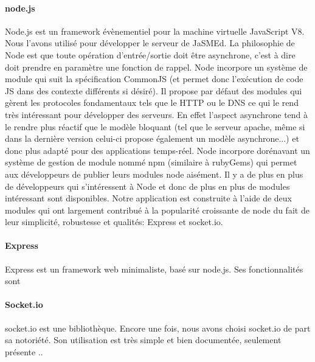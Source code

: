 \documentclass[pdftex,12pt,a4paper]{article}
\begin{document}
\paragraph{node.js}
Node.js est un framework évènementiel pour la machine virtuelle JavaScript V8. Nous l’avons utilisé pour développer le serveur de JaSMEd.
La philosophie de Node est que toute opération d’entrée/sortie doit être asynchrone, c’est à dire doit prendre en paramètre une fonction de rappel.
Node incorpore un système de module qui suit la spécification CommonJS (et permet donc l'exécution de code JS dans des contexte différents si désiré). Il propose par défaut des modules qui gèrent les protocoles fondamentaux tels que le HTTP ou le DNS ce qui le rend très intéressant pour développer des serveurs. En effet l’aspect asynchrone tend à le rendre plus réactif que le modèle bloquant (tel que le serveur apache, même si dans la dernière version celui-ci propose également un modèle asynchrone...) et donc plus adapté pour des applications temps-réel.
Node incorpore dorénavant un système de gestion de module nommé npm (similaire à rubyGems) qui permet aux développeurs de publier leurs modules node aisément.
Il y a de plus en plus de développeurs qui s’intéressent à Node et donc de plus en plus de modules intéressant sont disponibles. Notre application est construite à l’aide de deux modules qui ont largement contribué à la popularité croissante de node du fait de leur simplicité, robustesse et qualités: Express et socket.io.

\paragraph{Express}
Express est un framework web minimaliste, basé sur node.js. Ses fonctionnalités sont 

\paragraph{Socket.io}
socket.io est une bibliothèque.
Encore une fois, nous avons choisi socket.io de part sa notoriété. Son utilisation est très simple et bien documentée, seulement présente ..
\end{document}
